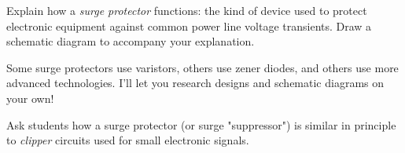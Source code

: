 

Explain how a {\it surge protector} functions: the kind of device used to protect electronic equipment against common power line voltage transients.  Draw a schematic diagram to accompany your explanation.







Some surge protectors use varistors, others use zener diodes, and others use more advanced technologies.  I'll let you research designs and schematic diagrams on your own!







Ask students how a surge protector (or surge "suppressor") is similar in principle to {\it clipper} circuits used for small electronic signals.




